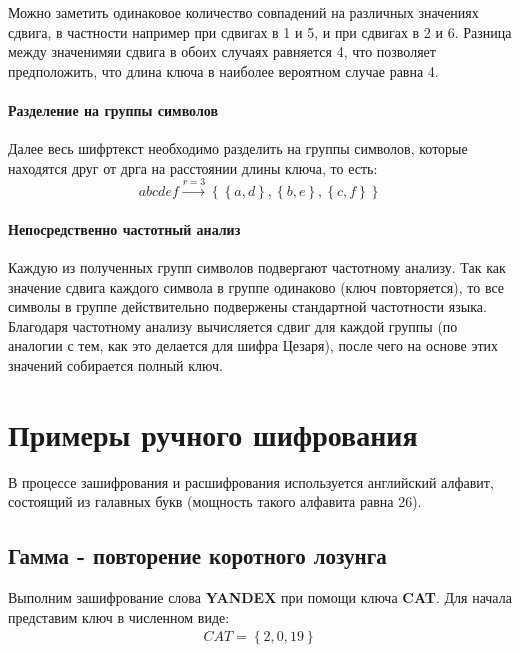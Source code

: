 \documentclass[a4paper]{article}
\begin{document}
  Можно заметить одинаковое количество совпадений на различных значениях сдвига,
  в частности например при сдвигах в 1 и 5, и при сдвигах в 2 и 6. Разница между
  значенимяи сдвига в обоих случаях равняется 4, что позволяет предположить, что длина
  ключа в наиболее вероятном случае равна 4.

  \paragraph{Разделение на группы символов}

  Далее весь шифртекст необходимо разделить на группы символов, которые находятся друг
  от дрга на расстоянии длины ключа, то есть:
  \begin{equation}
    \textit{abcdef} \overset{r = 3}{\longrightarrow} \left\{\left\{a,d\right\}, \left\{b,e\right\}, \left\{c,f\right\}\right\}
  \end{equation}

  \paragraph{Непосредственно частотный анализ}

  Каждую из полученных групп символов подвергают частотному анализу. Так как значение сдвига
  каждого символа в группе одинаково (ключ повторяется), то все символы в группе действительно
  подвержены стандартной частотности языка.
  Благодаря частотному анализу вычисляется сдвиг для каждой группы (по аналогии с тем,
  как это делается для шифра Цезаря), после чего на основе этих значений собирается полный ключ.

  \newpage
  \section{Примеры ручного шифрования}

  В процессе зашифрования и расшифрования используется английский алфавит, состоящий из
  галавных букв (мощность такого алфавита равна 26).

  \subsection{Гамма - повторение коротного лозунга}

  Выполним зашифрование слова \textbf{YANDEX} при помощи ключа \textbf{CAT}.
  Для начала представим ключ в численном виде:
  \begin{eqnarray}
    CAT = \left\{2, 0, 19\right\}
  \end{eqnarray}
\end{document}
